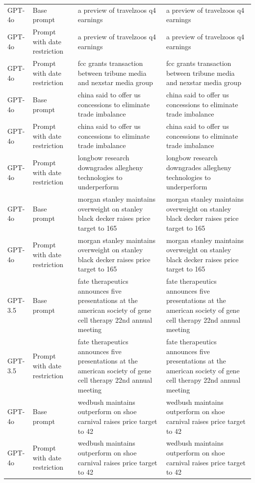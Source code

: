 \begin{longtable}{>{\raggedright\arraybackslash}p{1.4cm}>{\raggedright\arraybackslash}p{1.4cm}>{\raggedright\arraybackslash}p{5.5cm}>{\raggedright\arraybackslash}p{5.5cm}}
GPT-4o & Base prompt & a preview of travelzoos q4 earnings & a preview of travelzoos q4 earnings\\
GPT-4o & Prompt with date restriction & a preview of travelzoos q4 earnings & a preview of travelzoos q4 earnings\\
GPT-4o & Prompt with date restriction & fcc grants transaction between tribune media and nexstar media group & fcc grants transaction between tribune media and nexstar media group\\
GPT-4o & Base prompt & china said to offer us concessions to eliminate trade imbalance & china said to offer us concessions to eliminate trade imbalance\\
GPT-4o & Prompt with date restriction & china said to offer us concessions to eliminate trade imbalance & china said to offer us concessions to eliminate trade imbalance\\
GPT-4o & Prompt with date restriction & longbow research downgrades allegheny technologies to underperform & longbow research downgrades allegheny technologies to underperform\\
GPT-4o & Base prompt & morgan stanley maintains overweight on stanley black decker raises price target to 165 & morgan stanley maintains overweight on stanley black decker raises price target to 165\\
GPT-4o & Prompt with date restriction & morgan stanley maintains overweight on stanley black decker raises price target to 165 & morgan stanley maintains overweight on stanley black decker raises price target to 165\\
GPT-3.5 & Base prompt & fate therapeutics announces five presentations at the american society of gene cell therapy 22nd annual meeting & fate therapeutics announces five presentations at the american society of gene cell therapy 22nd annual meeting\\
GPT-3.5 & Prompt with date restriction & fate therapeutics announces five presentations at the american society of gene cell therapy 22nd annual meeting & fate therapeutics announces five presentations at the american society of gene cell therapy 22nd annual meeting\\
GPT-4o & Base prompt & wedbush maintains outperform on shoe carnival raises price target to 42 & wedbush maintains outperform on shoe carnival raises price target to 42\\
GPT-4o & Prompt with date restriction & wedbush maintains outperform on shoe carnival raises price target to 42 & wedbush maintains outperform on shoe carnival raises price target to 42\\

\end{longtable}
